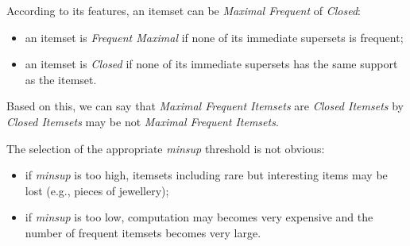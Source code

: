 According to its features, an itemset can be \emph{Maximal Frequent} of \emph{Closed}:
\begin{itemize}
	\item
	an itemset is \emph{Frequent Maximal} if none of its immediate supersets is frequent;
	\item
	an itemset is \emph{Closed} if none of its immediate supersets has the same support as the itemset.
\end{itemize}
Based on this, we can say that \emph{Maximal Frequent Itemsets} are \emph{Closed Itemsets} by \emph{Closed Itemsets} may be not \emph{Maximal Frequent Itemsets}.

The selection of the appropriate \emph{minsup} threshold is not obvious:
\begin{itemize}
	\item
	if \emph{minsup} is too high, itemsets including rare but interesting items may be lost (e.g., pieces of jewellery);
	\item
	if \emph{minsup} is too low, computation may becomes very expensive and the number of frequent itemsets becomes very large.
\end{itemize}
